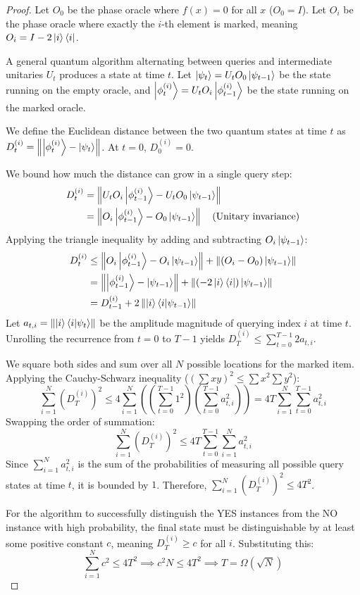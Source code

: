 \begin{proof}
    Let $O_0$ be the phase oracle where $f(x) = 0$ for all $x$ ($O_0 = I$). Let $O_i$ be the phase oracle where exactly the $i$-th element is marked, meaning $O_i = I - 2\ket{i}\bra{i}$.

    A general quantum algorithm alternating between queries and intermediate unitaries $U_t$ produces a state at time $t$. Let $\ket{\psi_t} = U_t O_0 \ket{\psi_{t-1}}$ be the state running on the empty oracle, and $\ket{\phi_t^{(i)}} = U_t O_i \ket{\phi_{t-1}^{(i)}}$ be the state running on the marked oracle.

    We define the Euclidean distance between the two quantum states at time $t$ as $D_t^{(i)} = \left\| \ket{\phi_t^{(i)}} - \ket{\psi_t} \right\|$. At $t=0$, $D_0^{(i)} = 0$.

    We bound how much the distance can grow in a single query step:
    \begin{align*}
        D_t^{(i)} &= \left\| U_t O_i \ket{\phi_{t-1}^{(i)}} - U_t O_0 \ket{\psi_{t-1}} \right\| \\
        &= \left\| O_i \ket{\phi_{t-1}^{(i)}} - O_0 \ket{\psi_{t-1}} \right\| \quad \text{(Unitary invariance)}
    \end{align*}
    Applying the triangle inequality by adding and subtracting $O_i \ket{\psi_{t-1}}$:
    \begin{align*}
        D_t^{(i)} &\leq \left\| O_i \ket{\phi_{t-1}^{(i)}} - O_i \ket{\psi_{t-1}} \right\| + \left\| (O_i - O_0) \ket{\psi_{t-1}} \right\| \\
        &= \left\| \ket{\phi_{t-1}^{(i)}} - \ket{\psi_{t-1}} \right\| + \left\| (-2\ket{i}\bra{i}) \ket{\psi_{t-1}} \right\| \\
        &= D_{t-1}^{(i)} + 2 \left\| \ket{i}\bra{i} \ket{\psi_{t-1}} \right\|
    \end{align*}
    Let $a_{t, i} = \left\| \ket{i}\bra{i} \ket{\psi_{t}} \right\|$ be the amplitude magnitude of querying index $i$ at time $t$. Unrolling the recurrence from $t=0$ to $T-1$ yields $D_T^{(i)} \leq \sum_{t=0}^{T-1} 2a_{t, i}$.

    We square both sides and sum over all $N$ possible locations for the marked item. Applying the Cauchy-Schwarz inequality ($\left(\sum x y\right)^2 \leq \sum x^2 \sum y^2$):
    \[ \sum_{i=1}^N \left( D_T^{(i)} \right)^2 \leq 4 \sum_{i=1}^N \left( \left( \sum_{t=0}^{T-1} 1^2 \right) \left( \sum_{t=0}^{T-1} a_{t, i}^2 \right) \right) = 4T \sum_{i=1}^N \sum_{t=0}^{T-1} a_{t, i}^2 \]
    Swapping the order of summation:
    \[ \sum_{i=1}^N \left( D_T^{(i)} \right)^2 \leq 4T \sum_{t=0}^{T-1} \sum_{i=1}^N a_{t, i}^2 \]
    Since $\sum_{i=1}^N a_{t, i}^2$ is the sum of the probabilities of measuring all possible query states at time $t$, it is bounded by $1$. Therefore, $\sum_{i=1}^N \left( D_T^{(i)} \right)^2 \leq 4T^2$.

    For the algorithm to successfully distinguish the YES instances from the NO instance with high probability, the final state must be distinguishable by at least some positive constant $c$, meaning $D_T^{(i)} \geq c$ for all $i$. Substituting this:
    \[ \sum_{i=1}^N c^2 \leq 4T^2 \implies c^2 N \leq 4T^2 \implies T = \Omega(\sqrt{N}) \]
\end{proof}

% 
% 
% 